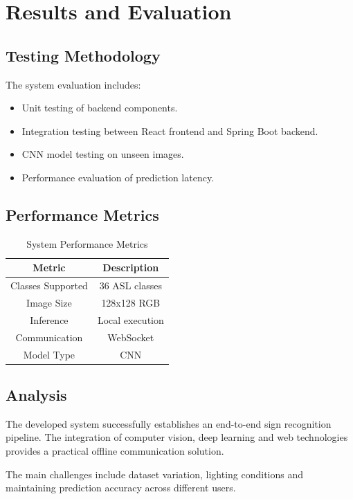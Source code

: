 \documentclass[11pt,a4paper]{report}
\begin{document}
\chapter{Results and Evaluation}

\section{Testing Methodology}

The system evaluation includes:

\begin{itemize}
\item Unit testing of backend components.
\item Integration testing between React frontend and Spring Boot backend.
\item CNN model testing on unseen images.
\item Performance evaluation of prediction latency.
\end{itemize}

\section{Performance Metrics}

\begin{table}[H]
\centering
\begin{tabular}{|c|c|}
\hline
Metric & Description\\
\hline
Classes Supported & 36 ASL classes\\
Image Size & 128x128 RGB\\
Inference & Local execution\\
Communication & WebSocket\\
Model Type & CNN\\
\hline
\end{tabular}
\caption{System Performance Metrics}
\end{table}


\section{Analysis}

The developed system successfully establishes an end-to-end sign recognition pipeline. The integration of computer vision, deep learning and web technologies provides a practical offline communication solution.

The main challenges include dataset variation, lighting conditions and maintaining prediction accuracy across different users.
\end{document}
